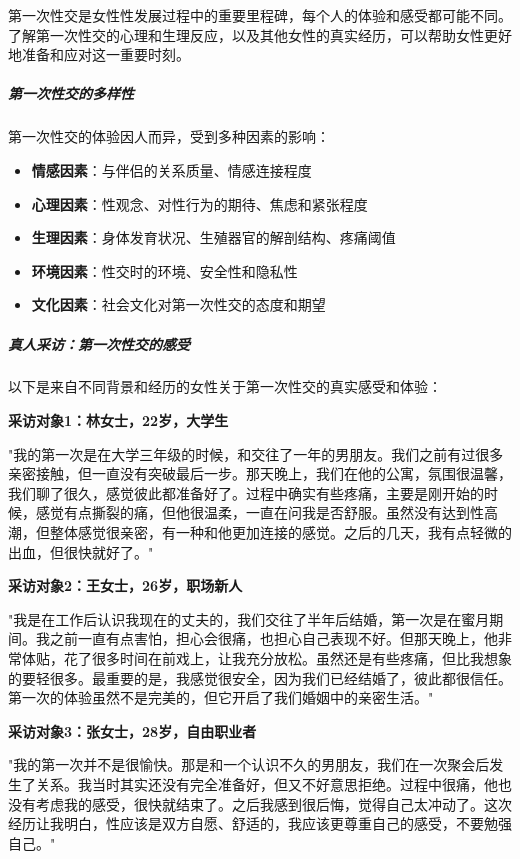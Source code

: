 \documentclass[12pt,UTF8]{ctexbook}
\begin{document}
第一次性交是女性性发展过程中的重要里程碑，每个人的体验和感受都可能不同。了解第一次性交的心理和生理反应，以及其他女性的真实经历，可以帮助女性更好地准备和应对这一重要时刻。

\subparagraph{第一次性交的多样性}

第一次性交的体验因人而异，受到多种因素的影响：

\begin{itemize}
\item \textbf{情感因素}：与伴侣的关系质量、情感连接程度
\item \textbf{心理因素}：性观念、对性行为的期待、焦虑和紧张程度
\item \textbf{生理因素}：身体发育状况、生殖器官的解剖结构、疼痛阈值
\item \textbf{环境因素}：性交时的环境、安全性和隐私性
\item \textbf{文化因素}：社会文化对第一次性交的态度和期望
\end{itemize}

\subparagraph{真人采访：第一次性交的感受}

以下是来自不同背景和经历的女性关于第一次性交的真实感受和体验：

\textbf{采访对象1：林女士，22岁，大学生}

"我的第一次是在大学三年级的时候，和交往了一年的男朋友。我们之前有过很多亲密接触，但一直没有突破最后一步。那天晚上，我们在他的公寓，氛围很温馨，我们聊了很久，感觉彼此都准备好了。过程中确实有些疼痛，主要是刚开始的时候，感觉有点撕裂的痛，但他很温柔，一直在问我是否舒服。虽然没有达到性高潮，但整体感觉很亲密，有一种和他更加连接的感觉。之后的几天，我有点轻微的出血，但很快就好了。"

\textbf{采访对象2：王女士，26岁，职场新人}

"我是在工作后认识我现在的丈夫的，我们交往了半年后结婚，第一次是在蜜月期间。我之前一直有点害怕，担心会很痛，也担心自己表现不好。但那天晚上，他非常体贴，花了很多时间在前戏上，让我充分放松。虽然还是有些疼痛，但比我想象的要轻很多。最重要的是，我感觉很安全，因为我们已经结婚了，彼此都很信任。第一次的体验虽然不是完美的，但它开启了我们婚姻中的亲密生活。"

\textbf{采访对象3：张女士，28岁，自由职业者}

"我的第一次并不是很愉快。那是和一个认识不久的男朋友，我们在一次聚会后发生了关系。我当时其实还没有完全准备好，但又不好意思拒绝。过程中很痛，他也没有考虑我的感受，很快就结束了。之后我感到很后悔，觉得自己太冲动了。这次经历让我明白，性应该是双方自愿、舒适的，我应该更尊重自己的感受，不要勉强自己。"
\end{document}
